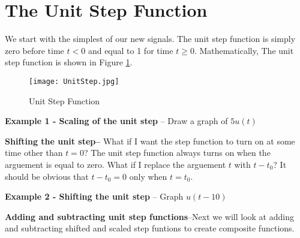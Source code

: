 \documentclass{handout}
\begin{document}
\section{The Unit Step Function}
We start with the simplest of our new signals.  The unit step function is simply zero before time $t<0$ and equal to 1 for time $t\ge0$.  Mathematically,
The unit step function is shown in Figure \ref{fig: UnitStep}.
\begin{figure} [h!]
\centering
\texttt{[image: UnitStep.jpg]}
\caption{Unit Step Function}
\label{fig: UnitStep}
\end{figure}

\textbf{Example 1 - Scaling of the unit step} -- Draw a graph of $5u(t)$


\textbf{Shifting the unit step--}  What if I want the step function to turn on at some time other than $t=0$? The unit step function always turns on when the arguement is equal to zero.  What if I replace the arguement $t$ with $t - t_0$? It should be obvious that $t-t_0=0$ only when $t=t_0$.

\newpage
\clearpage
\pagebreak

\textbf{Example 2 - Shifting the unit step} -- Graph $u(t-10)$



\textbf{Adding and subtracting unit step functions}--Next we will look at adding and subtracting shifted and scaled step funtions to create composite functions.
\end{document}
